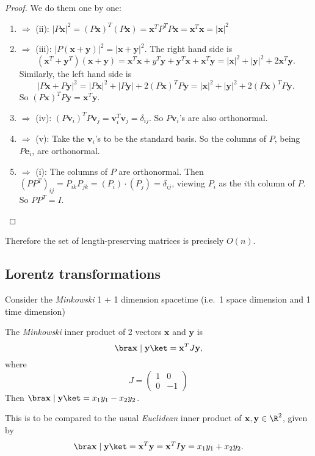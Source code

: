 \documentclass[a4paper]{article}
\begin{document}
\begin{proof}
  We do them one by one:
  \begin{enumerate}
    \item $\Rightarrow$ (ii): $|P\mathbf{x}|^2 = (P\mathbf{x})^T(P\mathbf{x}) = \mathbf{x}^TP^TP\mathbf{x} = \mathbf{x}^T\mathbf{x} = |\mathbf{x}|^2$
    \item $\Rightarrow$ (iii): $|P(\mathbf{x} + \mathbf{y})|^2 = |\mathbf{x + y}|^2$. The right hand side is
      \[
        (\mathbf{x}^T + \mathbf{y}^T)(\mathbf{x + y}) = \mathbf{x}^T\mathbf{x} + y^T\mathbf{y} + \mathbf{y}^T\mathbf{x} + \mathbf{x}^T\mathbf{y} = |\mathbf{x}|^2 + |\mathbf{y}|^2 + 2\mathbf{x}^T\mathbf{y}.
      \]
      Similarly, the left hand side is
      \[
        |P\mathbf{x} + P\mathbf{y}|^2 = |P\mathbf{x}|^2 + |P\mathbf{y}| + 2(P\mathbf{x})^TP\mathbf{y} = |\mathbf{x}|^2 + |\mathbf{y}|^2 + 2(P\mathbf{x})^TP\mathbf{y}.
      \]
      So $(P\mathbf{x})^TP\mathbf{y} = \mathbf{x}^T\mathbf{y}$.
    \item $\Rightarrow$ (iv): $(P\mathbf{v}_i)^TP\mathbf{v}_j = \mathbf{v}_i^T\mathbf{v}_j = \delta_{ij}$. So $P\mathbf{v}_i$'s are also orthonormal.
    \item $\Rightarrow$ (v): Take the $\mathbf{v}_i$'s to be the standard basis. So the columns of $P$, being $P\mathbf{e}_i$, are orthonormal.
    \item $\Rightarrow$ (i): The columns of $P$ are orthonormal. Then $(PP^T)_{ij} = P_{ik}P_{jk} = (P_i)\cdot (P_j) = \delta_{ij}$, viewing $P_i$ as the $i$th column of $P$. So $PP^T = I$.\qedhere
  \end{enumerate}
\end{proof}

Therefore the set of length-preserving matrices is precisely $O(n)$.

\subsection{Lorentz transformations}
Consider the \emph{Minkowski} 1 + 1 dimension spacetime (i.e.\ 1 space dimension and 1 time dimension)

\begin{defi}
  The \emph{Minkowski} inner product of 2 vectors $\mathbf{x}$ and $\mathbf{y}$ is
  \[
    \bra \mathbf{x}\mid \mathbf{y}\ket = \mathbf{x}^TJ\mathbf{y},
  \]
  where
  \[
    J =
    \begin{pmatrix}
      1 & 0\\
      0 & -1
    \end{pmatrix}
  \]
  Then $\bra \mathbf{x}\mid \mathbf{y}\ket = x_1y_1 - x_2y_2$.
\end{defi}
This is to be compared to the usual \emph{Euclidean} inner product of $\mathbf{x}, \mathbf{y}\in \R^2$, given by
\[
  \bra \mathbf{x}\mid \mathbf{y}\ket = \mathbf{x}^T\mathbf{y} = \mathbf{x}^TI\mathbf{y} = x_1y_1 + x_2y_2.
\]
\end{document}
